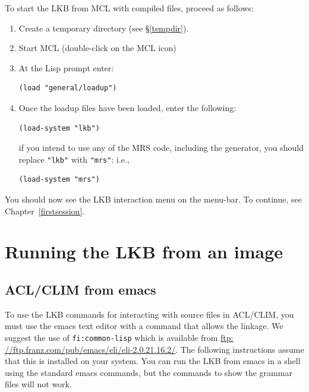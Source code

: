 \documentclass[12pt]{report}
\newcommand{\functionname}[1]{{\tt #1}}
\begin{document}
To start the LKB from MCL with compiled files, proceed as follows:
\begin{enumerate}
\item Create a temporary directory (see \S\ref{tempdir}).
\item Start MCL (double-click on the MCL icon)
\item At the Lisp prompt enter:
\begin{verbatim}
(load "general/loadup") 
\end{verbatim}
\item Once the loadup files have been loaded, enter the following:
\begin{verbatim}
(load-system "lkb")
\end{verbatim}
if you intend to use any of the MRS code, including the generator,
you should replace \verb+"lkb"+ with \verb+"mrs"+: i.e.,
\begin{verbatim}
(load-system "mrs")
\end{verbatim}
\end{enumerate}
You
should now see the LKB interaction menu on the menu-bar.
To continue, see Chapter~\ref{firstsession}.

\section{Running the LKB from an image}
\label{images}


\subsection{ACL/CLIM from emacs}
\label{emacs-clim-image}
To use the LKB commands for interacting with source
files in ACL/CLIM, you must use the emacs text editor with 
a command that allows the linkage.  We suggest
the use of \functionname{fi:common-lisp} which is available
from \href{ftp: //ftp.franz.com/pub/emacs/eli/eli-2.0.21.16.2/}{ftp: //ftp.franz.com/pub/emacs/eli/eli-2.0.21.16.2/}.  The following
instructions assume that this is installed on your system.
You can run the LKB from emacs in a shell using the standard
emacs commands, but the commands to show the grammar files
will not work.
\end{document}
